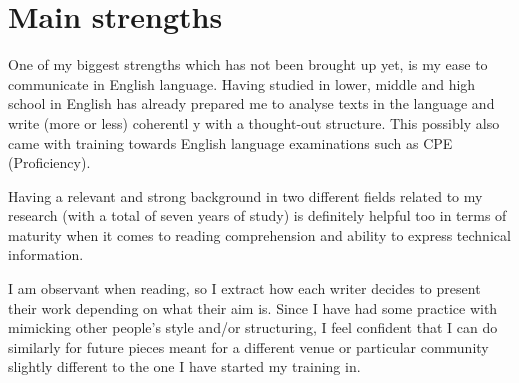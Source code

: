 
\section{Main strengths}
\label{sec:strengths}

One of my biggest strengths which has not been brought up yet, is my ease
 to communicate in English language.
 Having studied in lower, middle and high school in English has already
 prepared me to analyse texts in the language and write (more or less) coherentl
y with a thought-out structure.
 This possibly also came with training towards English language examinations
 such as CPE (Proficiency).

Having a relevant and strong background in two different fields related
 to my research (with a total of seven years of study) is definitely helpful
 too in terms of maturity when it comes to reading comprehension and ability
 to express technical information.

I am observant when reading, so I extract how each writer decides to present
 their work depending on what their aim is.
 Since I have had some practice with mimicking other people's style and/or
 structuring, I feel confident that I can do similarly for future pieces
 meant for a different venue or particular community slightly different
 to the one I have started my training in.


